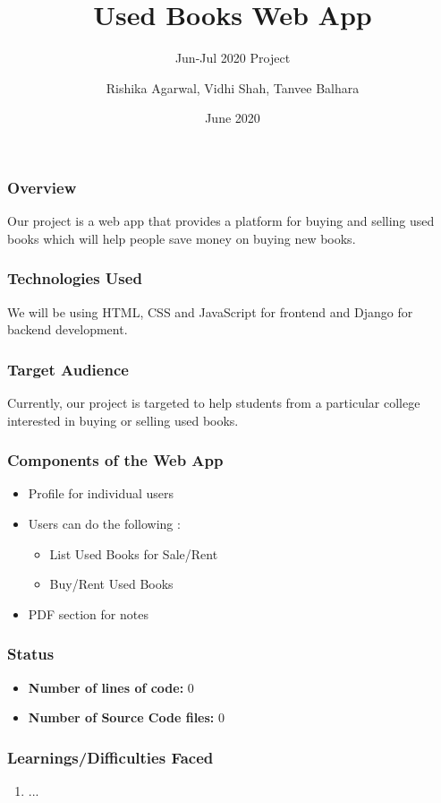 \documentclass[14pt]{beamer}
\title[USED BOOKS]{Used Books Web App}
\subtitle{Jun-Jul 2020 Project}
\author[Team 14]{Rishika Agarwal, Vidhi Shah, Tanvee Balhara}
\date{June 2020}
\begin{document}
\begin{frame}
    \titlepage
\end{frame}

\begin{frame}
    \frametitle{Overview}
    Our project is a web app that provides a platform for buying and selling used books which will help people save money on buying new books.
\end{frame}

\begin{frame}
    \frametitle{Technologies Used}
    We will be using HTML, CSS and JavaScript for frontend and Django for backend development.
\end{frame}

\begin{frame}
    \frametitle{Target Audience}
    Currently, our project is targeted to help students from a particular college interested in buying or selling used books.
\end{frame}

\begin{frame}
    \frametitle{Components of the Web App}
    \begin{itemize}
        \item  Profile for individual users
        \item  Users can do the following :
            \begin{itemize}
                \item  List Used Books for Sale/Rent
                \item  Buy/Rent Used Books
            \end{itemize}
    \item  PDF section for notes
    \end{itemize}
\end{frame}

\begin{frame}
    \frametitle{Status}
    \begin{itemize}
        \item \textbf{Number of lines of code: } 0
        \item \textbf{Number of Source Code files: } 0
    \end{itemize}
\end{frame}

\begin{frame}
    \frametitle{Learnings/Difficulties Faced}
    \begin{enumerate}
        \item ...
    \end{enumerate}
\end{frame}
\end{document}
